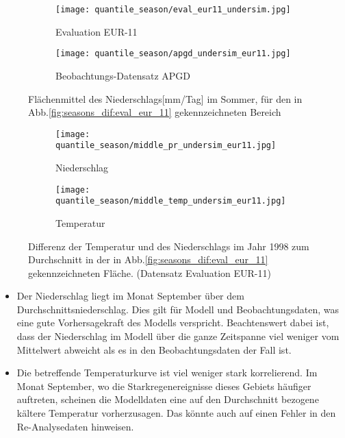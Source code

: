 \begin{figure}[h]
	\begin{subfigure}{0.49\textwidth}
		\texttt{[image: quantile\_season/eval\_eur11\_undersim.jpg]}
		\caption{Evaluation EUR-11}
		\label{fig:season:under_eval_eur11}
	\end{subfigure}
	\begin{subfigure}{0.49\textwidth}
		\texttt{[image: quantile\_season/apgd\_undersim\_eur11.jpg]}
		\caption{Beobachtungs-Datensatz APGD}
		\label{fig:season:under_apgd_eur11}
	\end{subfigure}
	\caption{Flächenmittel des Niederschlags[mm/Tag] im Sommer, für den in Abb.\ref{fig:seasons_dif:eval_eur_11} gekennzeichneten Bereich}
\end{figure}

\begin{figure}[h]
	\begin{subfigure}{0.49\textwidth}
		\texttt{[image: quantile\_season/middle\_pr\_undersim\_eur11.jpg]}
		\caption{Niederschlag}
	\end{subfigure}
	\begin{subfigure}{0.49\textwidth}
		\texttt{[image: quantile\_season/middle\_temp\_undersim\_eur11.jpg]}
		\caption{Temperatur}
	\end{subfigure}
	\caption{Differenz der Temperatur und des Niederschlags im Jahr 1998 zum Durchschnitt in der in Abb.\ref{fig:seasons_dif:eval_eur_11} gekennzeichneten Fläche. (Datensatz Evaluation EUR-11)}
	\label{fig:seasons:undersim_eval_eur11}
\end{figure}

\begin{itemize}
	\item Der Niederschlag liegt im Monat September über dem Durchschnittsniederschlag. Dies gilt für Modell und Beobachtungsdaten, was eine gute Vorhersagekraft des Modells verspricht. Beachtenswert dabei ist, dass der Niederschlag im Modell über die ganze Zeitspanne viel weniger vom Mittelwert abweicht als es in den Beobachtungsdaten der Fall ist.
	\item Die betreffende Temperaturkurve ist viel weniger stark korrelierend. Im Monat September, wo die Starkregenereignisse dieses Gebiets häufiger auftreten, scheinen die Modelldaten eine auf den Durchschnitt bezogene kältere Temperatur vorherzusagen. Das könnte auch auf einen Fehler in den Re-Analysedaten hinweisen.
\end{itemize}
\newpage

